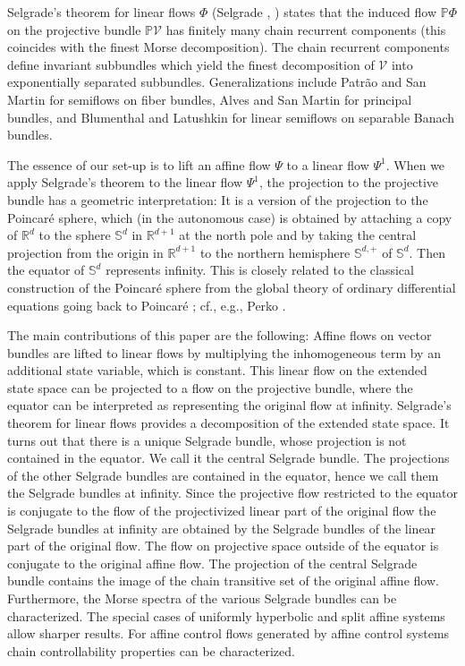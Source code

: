 	Selgrade's theorem for linear flows $\Phi$ (Selgrade \cite{Selg75},
	\cite[Theorem 9.2.5]{ColK14}) states that the induced flow $\mathbb{P}\Phi$ on
	the projective bundle $\mathbb{P}\mathcal{V}$ has finitely many chain
	recurrent components (this coincides with the finest Morse decomposition). The
	chain recurrent components define invariant subbundles which yield the finest
	decomposition of $\mathcal{V}$ into exponentially separated subbundles.
	Generalizations include Patr\~{a}o and San Martin \cite{PatSM07} for semiflows
	on fiber bundles, Alves and San Martin \cite{AlvSM16} for principal bundles,
	and Blumenthal and Latushkin \cite{BluL19} for linear semiflows on separable
	Banach bundles.
	
	The essence of our set-up is to lift an affine flow $\Psi$ to a linear flow
	$\Psi^{1}$. When we apply Selgrade's theorem to the linear flow $\Psi^{1}$,
	the projection to the projective bundle has a geometric interpretation: It is
	a version of the projection to the Poincar\'{e} sphere, which (in the
	autonomous case) is obtained by attaching a copy of $\mathbb{R}^{d}$ to the
	sphere $\mathbb{S}^{d}$ in $\mathbb{R}^{d+1}$ at the north pole and by taking
	the central projection from the origin in $\mathbb{R}^{d+1}$ to the northern
	hemisphere $\mathbb{S}^{d,+}$ of $\mathbb{S}^{d}$. Then the equator of
	$\mathbb{S}^{d}$ represents infinity. This is closely related to the classical
	construction of the Poincar\'{e} sphere from the global theory of ordinary
	differential equations going back to Poincar\'{e} \cite{Poin}; cf., e.g.,
	Perko \cite[Section 3.10]{Perko}.
	
	The main contributions of this paper are the following: Affine flows on vector
	bundles are lifted to linear flows by multiplying the inhomogeneous term by an
	additional state variable, which is constant. This linear flow on the extended
	state space can be projected to a flow on the projective bundle, where the
	equator can be interpreted as representing the original flow at infinity.
	Selgrade's theorem for linear flows provides a decomposition of the extended
	state space. It turns out that there is a unique Selgrade bundle, whose
	projection is not contained in the equator. We call it the central Selgrade
	bundle. The projections of the other Selgrade bundles are contained in the
	equator, hence we call them the Selgrade bundles at infinity. Since the
	projective flow restricted to the equator is conjugate to the flow of the
	projectivized linear part of the original flow the Selgrade bundles at
	infinity are obtained by the Selgrade bundles of the linear part of the
	original flow. The flow on projective space outside of the equator is
	conjugate to the original affine flow. The projection of the central Selgrade
	bundle contains the image of the chain transitive set of the original affine
	flow. Furthermore, the Morse spectra of the various Selgrade bundles can be
	characterized. The special cases of uniformly hyperbolic and split affine
	systems allow sharper results. For affine control flows generated by affine
	control systems chain controllability properties can be characterized.
	
